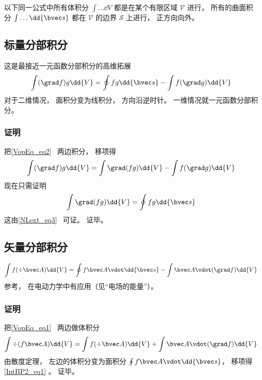 

以下同一公式中所有体积分 $\int \dots \dd{V}$ 都是在某个有限区域 $\mathcal V$ 进行， 所有的曲面积分 $\int \dots \dd{\bvec s}$ 都在 $\mathcal V$ 的边界 $\mathcal S$ 上进行， 正方向向外。

\subsection{标量分部积分}
这是最接近一元函数分部积分的高维拓展
\begin{equation}\label{IntBP2_eq2}
\int (\grad f) g \dd{V} = \oint fg \dd{\bvec s} - \int f (\grad g) \dd{V}
\end{equation}
对于二维情况， 面积分变为线积分， 方向沿逆时针。 一维情况就一元函数分部积分。

\subsubsection{证明}
把\autoref{VopEq_eq2}~ 两边积分， 移项得
\begin{equation}
\int (\grad f) g \dd{V} = \int \grad (fg) \dd{V} - \int f (\grad g) \dd{V}
\end{equation}
现在只需证明
\begin{equation}
\int \grad (fg) \dd{V} = \oint fg \dd{\bvec s}
\end{equation}
这由\autoref{NLext_eq3}~ 可证。 证毕。

\subsection{矢量分部积分}
\begin{equation}\label{IntBP2_eq1}
\int f (\div \bvec A)\dd{V} =  \oint f \bvec A \vdot \dd{\bvec s} - \int\bvec A \vdot (\grad f)\dd{V}
\end{equation}
参考\cite{GriffE}， 在电动力学中有应用（见“电场的能量”）。

\subsubsection{证明}
把\autoref{VopEq_eq1}~ 两边做体积分
\begin{equation}
\int\div (f \bvec A) \dd{V} = \int f (\div \bvec A)\dd{V} + \int\bvec A \vdot (\grad f)\dd{V}
\end{equation}
由散度定理， 左边的体积分变为面积分 $\oint f \bvec A \vdot \dd{\bvec s}$， 移项得\autoref{IntBP2_eq1} 。 证毕。

